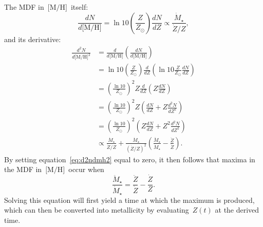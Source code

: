\documentclass[12pt]{article}
\newcommand{\mh}{\ensuremath{\text{[M/H]}}}
\begin{document}
The MDF in~\mh~itself:
\begin{equation}
\frac{dN}{d\mh} = \ln 10 \left(\frac{Z}{Z_\odot}\right) \frac{dN}{dZ}
\propto \frac{\dot{M}_\star}{\dot{Z} / Z},
\label{eq:dndmh}
\end{equation}
and its derivative:
\begin{subequations}\begin{align}
\frac{d^2N}{d\mh^2} &= \frac{d}{d\mh} \left(\frac{dN}{d\mh}\right)
\\
&= \ln 10 \left(\frac{Z}{Z_\odot}\right) \frac{d}{dZ}
\left(\ln 10 \frac{Z}{Z_\odot} \frac{dN}{dZ}\right)
\\
&= \left(\frac{\ln 10}{Z_\odot}\right)^2 Z\frac{d}{dZ}
\left(Z\frac{dN}{dZ}\right)
\\
&= \left(\frac{\ln 10}{Z_\odot}\right)^2
Z\left(\frac{dN}{dZ} + Z\frac{d^2N}{dZ^2}\right)
\\
&= \left(\frac{\ln 10}{Z_\odot}\right)^2 \left(Z\frac{dN}{dZ} +
Z^2 \frac{d^2N}{dZ^2}\right)
\\
&\propto \frac{\dot{M}_\star}{\dot{Z} / Z} +
\frac{\dot{M}_\star}{(\dot{Z} / Z)^2}
\left(\frac{\ddot{M}_\star}{\dot{M}_\star} - \frac{\ddot{Z}}{\dot{Z}}\right).
\label{eq:d2ndmh2}
\end{align}\end{subequations}
By setting equation~\ref{eq:d2ndmh2} equal to zero, it then follows that maxima
in the MDF in~\mh~occur when
\begin{equation}
\frac{\ddot{M}_\star}{\dot{M}_\star} = \frac{\ddot{Z}}{\dot{Z}} -
\frac{\dot{Z}}{Z}.
\label{eq:mhmdf_maxima_criterion}
\end{equation}
Solving this equation will first yield a time at which the maximum is produced,
which can then be converted into metallicity by evaluating~$Z(t)$ at the
derived time.
\end{document}
